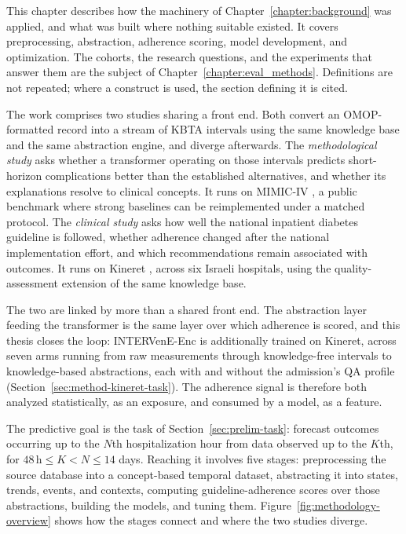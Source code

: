 \label{sec:method-computational}
This chapter describes how the machinery of Chapter~\ref{chapter:background} was
applied, and what was built where nothing suitable existed. It covers
preprocessing, abstraction, adherence scoring, model development, and
optimization. The cohorts, the research questions, and the experiments that
answer them are the subject of Chapter~\ref{chapter:eval_methods}. Definitions
are not repeated; where a construct is used, the section defining it is cited.

The work comprises two studies sharing a front end. Both convert an OMOP-formatted record into a stream of KBTA intervals using the same knowledge base and the same abstraction engine, and diverge afterwards. The \emph{methodological study} asks whether a transformer operating on those intervals predicts short-horizon complications better than the established alternatives, and whether its explanations resolve to clinical concepts. It runs on MIMIC-IV \citep{johnson2023mimiciv}, a public benchmark where strong baselines can be reimplemented under a matched protocol. The \emph{clinical study} asks how well the national inpatient diabetes guideline is followed, whether adherence changed after the national implementation effort, and which recommendations remain associated with outcomes. It runs on Kineret \citep{kineret-israel-largest-hospital-network-omop-common-data-model}, across six Israeli hospitals, using the quality-assessment extension of the same knowledge base.

The two are linked by more than a shared front end. The abstraction layer feeding the transformer is the same layer over which adherence is scored, and this thesis closes the loop: INTERVenE-Enc is additionally trained on Kineret, across seven arms running from raw measurements through knowledge-free intervals to knowledge-based abstractions, each with and without the admission's QA profile (Section~\ref{sec:method-kineret-task}). The adherence signal is therefore both analyzed statistically, as an exposure, and consumed by a model, as a feature.

The predictive goal is the task of Section~\ref{sec:prelim-task}: forecast outcomes occurring up to the $N$th hospitalization hour from data observed up to the $K$th, for $48\,\text{h} \le K < N \le 14$ days. Reaching it involves five stages: preprocessing the source database into a concept-based temporal dataset, abstracting it into states, trends, events, and contexts, computing guideline-adherence scores over those abstractions, building the models, and tuning them. Figure~\ref{fig:methodology-overview} shows how the stages connect and where the two studies diverge.

